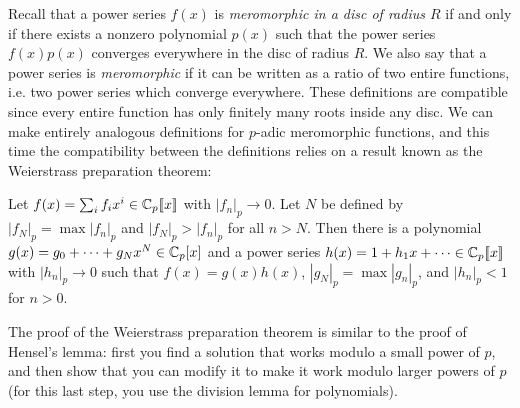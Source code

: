 \documentclass[letterpaper,11pt]{article}
\begin{document}
Recall that a power series $f(x)$ is \emph{meromorphic in a disc of radius $R$} if and only if there exists a nonzero polynomial $p(x)$ such that the power series $f(x)p(x)$ converges everywhere in the disc of radius $R$. We also say that a power series is \emph{meromorphic} if it can be written as a ratio of two entire functions, i.e. two power series which converge everywhere. These definitions are compatible since every entire function has only finitely many roots inside any disc. We can make entirely analogous definitions for $p$-adic meromorphic functions, and this time the compatibility between the definitions relies on a result known as the Weierstrass preparation theorem:

\begin{prop} Let $f(x) = \sum_i f_i x^i \in \mathbb{C}_p[\![x]\!]$ with $|f_n|_p \rightarrow 0$. Let $N$ be defined by $|f_N|_p = \max |f_n|_p$ and $|f_N|_p > |f_n|_p$ for all $n > N$. Then there is a polynomial $g(x) = g_0 + \cdots + g_Nx^N \in \mathbb{C}_p[x]$ and a power series $h(x) = 1 + h_1x + \cdots \in \mathbb{C}_p[\![x]\!]$ with $|h_n|_p \rightarrow 0$ such that $f(x) = g(x)h(x)$, $|g_N|_p = \max |g_n|_p$, and $|h_n|_p < 1$ for $n > 0$.
\end{prop}

The proof of the Weierstrass preparation theorem is similar to the proof of Hensel's lemma: first you find a solution that works modulo a small power of $p$, and then show that you can modify it to make it work modulo larger powers of $p$ (for this last step, you use the division lemma for polynomials).
\end{document}
